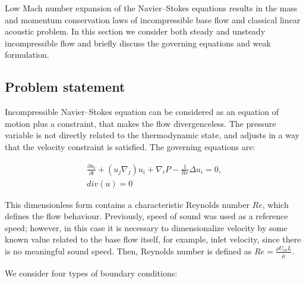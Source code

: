 Low Mach number expansion of the Navier--Stokes equations results in the mass and momentum conservation laws of incompressible base flow and classical linear acoustic problem. In this section we consider both steady and unsteady incompressible flow and briefly discuss the governing equations and weak formulation.

\subsection{Problem statement}

Incompressible Navier--Stokes equation can be considered as an equation of motion plus a constraint, that makes the flow divergenceless. The pressure variable is not directly related to the thermodynamic state, and adjusts in a way that the velocity constraint is satisfied. The governing equations are:

\begin{subequations}
\label{eq:IncNSeqFull}
    \begin{align}
    \label{eq:IncNSeq}
    \frac{\partial u_i}{\partial t} + (u_j \nabla_j) u_i + \nabla_i P - \frac{1}{Re} \Delta u_i = 0, \\
    \label{eq:div0cons}
    div(u) = 0
    \end{align}
\end{subequations}

This dimensionless form contains a characteristic Reynolds number $Re$, which defines the flow behaviour. Previously, speed of sound was used as a reference speed; however, in this case it is necessary to dimensionalize velocity by some known value related to the base flow itself, for example, inlet velocity, since there is no meaningful sound speed. Then, Reynolds number is defined as $Re = \frac{\rho U_{in} L}{\mu}$.

We consider four types of boundary conditions:

